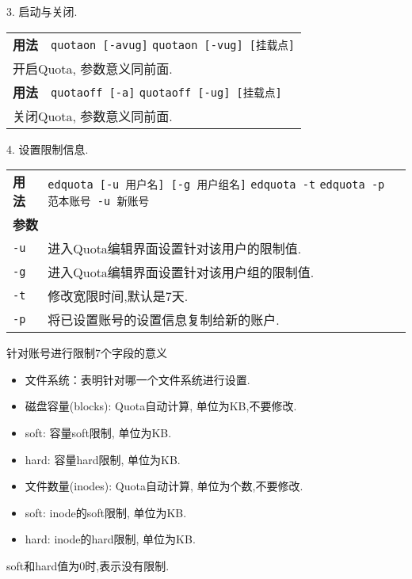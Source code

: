 \par
3. 启动与关闭.
\begin{longtable}{l@{ : }p{}}\hline\hline

    \textbf{用法} & \verb"quotaon [-avug]" \newline
                    \verb"quotaon [-vug] [挂载点]"  \\
    \multicolumn{2}{l}{开启Quota, 参数意义同前面.}\\

    \textbf{用法} & \verb"quotaoff [-a]" \newline
                    \verb"quotaoff [-ug] [挂载点]"  \\

    \multicolumn{2}{l}{关闭Quota, 参数意义同前面.}\\

    \hline
\end{longtable}

\par
4. 设置限制信息.
\begin{longtable}{l@{ : }p{}}\hline\hline

    \textbf{用法} & \verb"edquota [-u 用户名] [-g 用户组名]" \newline
                    \verb"edquota -t"  \newline
                    \verb"edquota -p 范本账号 -u 新账号"\\
    \multicolumn{2}{l}{\bfseries 参数}\\

    \texttt{-u} & 进入Quota编辑界面设置针对该用户的限制值.\\

    \texttt{-g} & 进入Quota编辑界面设置针对该用户组的限制值.\\

    \texttt{-t} & 修改宽限时间,默认是7天.\\

    \texttt{-p} & 将已设置账号的设置信息复制给新的账户.\\

    \hline
\end{longtable}
针对账号进行限制7个字段的意义
\begin{itemize}
    \item 文件系统：表明针对哪一个文件系统进行设置.

    \item 磁盘容量(blocks): Quota自动计算, 单位为KB,不要修改.

    \item soft: 容量soft限制, 单位为KB.

    \item hard: 容量hard限制, 单位为KB.

    \item 文件数量(inodes): Quota自动计算, 单位为个数,不要修改.

    \item soft: inode的soft限制, 单位为KB.

    \item hard: inode的hard限制, 单位为KB.
\end{itemize}
soft和hard值为0时,表示没有限制.

